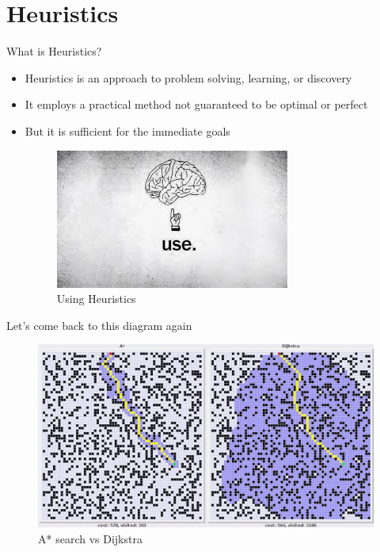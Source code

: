 \documentclass[14pt]{beamer}
\begin{document}
\section{Heuristics}
\begin{frame}{What is Heuristics?}
	
	\begin{itemize}
		\item<1-> Heuristics is an approach to problem solving, learning, or discovery
		\item<2-> It employs a practical method not guaranteed to be optimal or perfect
		\item<3-> But it is sufficient for the immediate goals
		\begin{figure}[H]
		    \centering
		    \includegraphics[width = .5\textwidth, height=0.35\textheight]{brain.jpg}
		    \caption{Using Heuristics}
	\end{figure}

	\end{itemize}

\end{frame}

\begin{frame}{Let's come back to this diagram again}
	\begin{figure}[h]
	\centering
		\includegraphics[scale=0.4]{avsdijkstra.jpg}
		\caption{A* search vs Dijkstra}
	\end{figure}
\end{frame}
\end{document}

